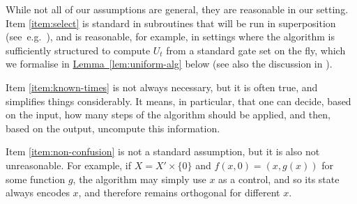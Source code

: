 \documentclass{article}
\newcommand{\lem}[1]{\hyperref[lem:#1]{Lemma~\ref*{lem:#1}}}
\renewcommand{\>}{\rangle}
\newcommand{\<}{\langle}
\renewcommand{\(}{\left(}
\renewcommand{\)}{\right)}
\begin{document}
While not all of our assumptions are general, they are reasonable in our setting. Item \ref{item:select} is standard in subroutines that will be run in superposition (see~e.g.~\cite{ambainis2010VTSearch}), and is reasonable, for example, in settings where the algorithm is sufficiently structured to compute $U_t$ from a standard gate set on the fly, which we formalise in \lem{uniform-alg} below (see also the discussion in \cite[Section 2.2]{cornelissen2020SpanProgramTime}). 

Item \ref{item:known-times} is not always necessary, but it is often true, and simplifies things considerably. It means, in particular, that one can decide, based on the input, how many steps of the algorithm should be applied, and then, based on the output, uncompute this information.

Item \ref{item:non-confusion}
is not a standard assumption, but it is also not unreasonable. For example, if 
$X=X'\times\{0\}$ and $f(x,0)=(x,g(x))$ for some function $g$, the algorithm may simply use $x$ as a control, and so its state always encodes $x$, and therefore remains orthogonal for different $x$. 
\end{document}
